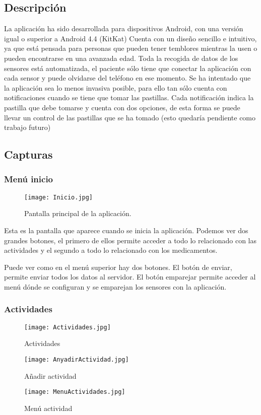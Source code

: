 \documentclass[11pt,spanish]{article}
\begin{document}
\subsection{Descripción}
La aplicación ha sido desarrollada para dispositivos Android, con una versión igual o superior a Android 4.4 (KitKat) Cuenta con un diseño sencillo e intuitivo, ya que está pensada para personas que pueden tener temblores mientras la usen o pueden encontrarse en una avanzada edad. Toda la recogida de datos de los sensores está automatizada, el paciente sólo tiene que conectar la aplicación con cada sensor y puede olvidarse del teléfono en ese momento. Se ha intentado que la aplicación sea lo menos invasiva posible, para ello tan sólo cuenta con notificaciones cuando se tiene que tomar las pastillas. Cada notificación indica la pastilla que debe tomarse y cuenta con dos opciones, de esta forma se puede llevar un control de las pastillas que se ha tomado (esto quedaría pendiente como trabajo futuro)
\newline

\subsection{Capturas}
\subsubsection{Menú inicio}
\begin{figure}[!htb]
\centering
\texttt{[image: Inicio.jpg]}
\caption{Pantalla principal de la aplicación.}
\end{figure}
Esta es la pantalla que aparece cuando se inicia la aplicación. Podemos ver dos grandes botones, el primero de ellos permite acceder a todo lo relacionado con las actividades y el segundo a todo lo relacionado con los medicamentos.
\newline

Puede ver como en el menú superior hay dos botones. El botón de enviar, permite enviar todos los datos al servidor. El botón emparejar permite acceder al menú dónde se configuran y se emparejan los sensores con la aplicación.
\newpage

\subsubsection{Actividades}
\begin{figure}[!htb]
  \texttt{[image: Actividades.jpg]}
  \caption{Actividades}
\endminipage\hfill
{}
  \texttt{[image: AnyadirActividad.jpg]}
  \caption{Añadir actividad}
\endminipage\hfill
{}%
  \texttt{[image: MenuActividades.jpg]}
  \caption{Menú actividad}
\endminipage
\end{figure}
\end{document}
